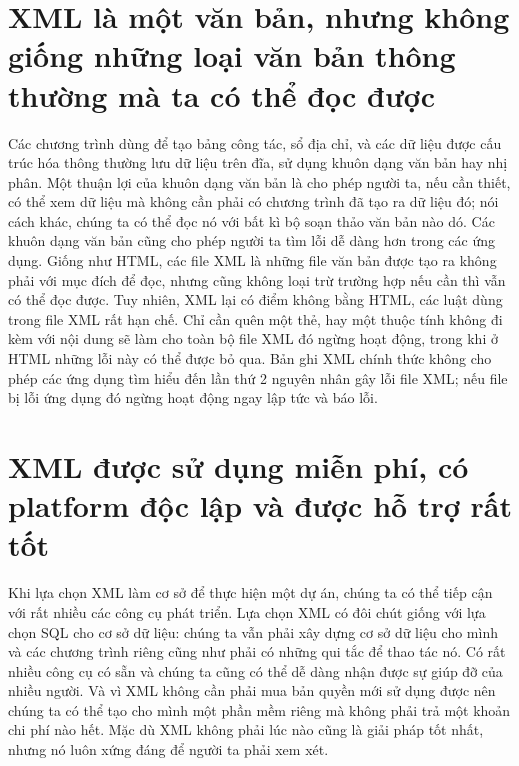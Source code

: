 \section*{XML là một văn bản, nhưng không giống những loại văn bản thông thường mà ta có thể đọc được }
Các chương trình dùng để tạo bảng công tác, sổ địa chỉ, và các dữ liệu được cấu trúc hóa thông thường lưu dữ liệu trên đĩa, sử dụng khuôn dạng văn bản hay nhị phân. Một thuận lợi của khuôn dạng văn bản là cho phép người ta, nếu cần thiết, có thể xem dữ liệu mà không cần phải có chương trình đã tạo ra dữ liệu đó; nói cách khác, chúng ta có thể đọc nó với bất kì bộ soạn thảo văn bản nào dó. Các khuôn dạng văn bản cũng cho phép người ta tìm lỗi dễ dàng hơn trong các ứng dụng. Giống như HTML, các file XML là những file văn bản được tạo ra không phải với mục đích để đọc, nhưng cũng không loại trừ trường hợp nếu cần thì vẫn có thể đọc được. Tuy nhiên, XML lại có điểm không bằng HTML, các luật dùng trong file XML rất hạn chế. Chỉ cần quên một thẻ, hay một thuộc tính không đi kèm với nội dung sẽ làm cho toàn bộ file XML đó ngừng hoạt động, trong khi ở HTML những lỗi này có thể được bỏ qua. Bản ghi XML chính thức không cho phép các ứng dụng tìm hiểu đến lần thứ 2 nguyên nhân gây lỗi file XML; nếu file bị lỗi ứng dụng đó ngừng hoạt động ngay lập tức và báo lỗi.
\section*{XML được sử dụng miễn phí, có platform độc lập và được hỗ trợ rất tốt}
Khi lựa chọn XML làm cơ sở để thực hiện một dự án, chúng ta có thể tiếp cận với rất nhiều các công cụ phát triển. Lựa chọn XML có đôi chút giống với lựa chọn SQL cho cơ sở dữ liệu: chúng ta vẫn phải xây dựng cơ sở dữ liệu cho mình và các chương trình riêng cũng như phải có những qui tắc để thao tác nó. Có rất nhiều công cụ có sẵn và chúng ta cũng có thể dễ dàng nhận được sự giúp đỡ của nhiều người. Và vì XML không cần phải mua bản quyền mới sử dụng được nên chúng ta có thể tạo cho mình một phần mềm riêng mà không phải trả một khoản chi phí nào hết. Mặc dù XML không phải lúc nào cũng là giải pháp tốt nhất, nhưng nó luôn xứng đáng để người ta phải xem xét.
